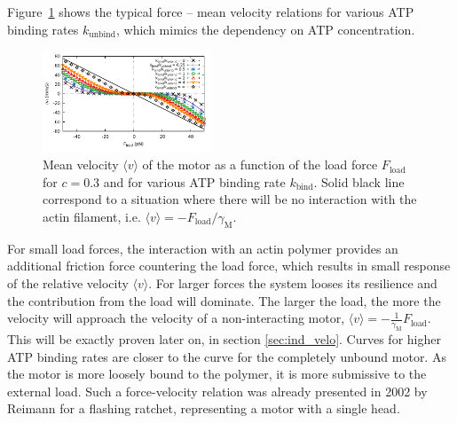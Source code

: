 \documentclass[aps,pre,twocolumn,showpacs,showkeys,superscriptaddress,floatfix]{revtex4-1}
\begin{document}
Figure~\ref{fig:F_v} shows the typical force -- mean velocity relations for various ATP binding rates $k_\text{unbind}$, which mimics the dependency on ATP concentration.
\begin{figure}[t]
\centering
\includegraphics[width=0.45\textwidth,height=!]{F_v}
\caption{
\label{fig:F_v} 
Mean velocity $\langle v \rangle$ of the motor as a function of the load force $F_\text{load}$ for $c=0.3$ and for various ATP binding rate $k_\text{bind}$.
Solid black line correspond to a situation where there will be no interaction with the actin filament, i.e. $\langle v \rangle = - F_\text{load} / \gamma_\text{M}$. 
}
\end{figure}
For small load forces, the interaction with an actin polymer provides an additional friction force countering the load force, 
which results in small response of the relative velocity $\langle v \rangle$.
For larger forces the system looses its resilience and the contribution from the load will dominate. 
The larger the load, the more the velocity will approach the velocity of a non-interacting motor, $\langle v \rangle = - \frac{1}{\gamma_\text{M}} F_\text{load}$.
This will be exactly proven later on, in section \ref{sec:ind_velo}. 
Curves for higher ATP binding rates are closer to the curve for the completely unbound motor.
As the motor is more loosely bound to the polymer, it is more submissive to the external load.
Such a force-velocity relation was already presented in 2002 by Reimann \cite{reimann2002brownian} for a flashing ratchet, representing a motor with a single head.
\end{document}
